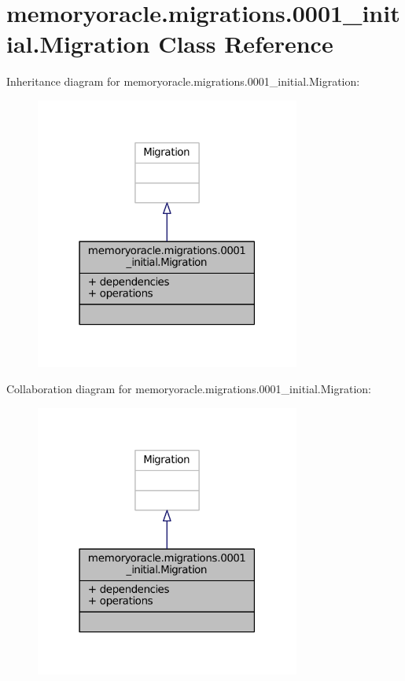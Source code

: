 \hypertarget{classmemoryoracle_1_1migrations_1_10001__initial_1_1Migration}{}\section{memoryoracle.\+migrations.0001\+\_\+initial.Migration Class Reference}
\label{classmemoryoracle_1_1migrations_1_10001__initial_1_1Migration}


Inheritance diagram for memoryoracle.\+migrations.0001\+\_\+initial.Migration\+:\nopagebreak
\begin{figure}[H]
\begin{center}
\leavevmode
\includegraphics[width=247pt]{classmemoryoracle_1_1migrations_1_10001__initial_1_1Migration__inherit__graph}
\end{center}
\end{figure}


Collaboration diagram for memoryoracle.\+migrations.0001\+\_\+initial.Migration\+:\nopagebreak
\begin{figure}[H]
\begin{center}
\leavevmode
\includegraphics[width=247pt]{classmemoryoracle_1_1migrations_1_10001__initial_1_1Migration__coll__graph}
\end{center}
\end{figure}
